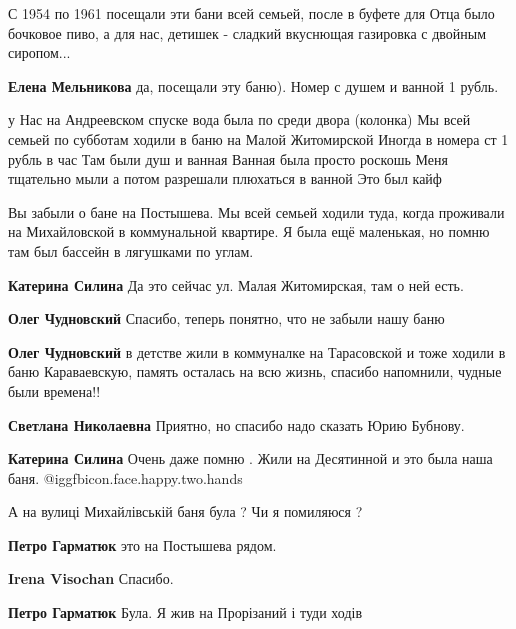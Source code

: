 \begin{itemize}
\begin{itemize}
С 1954 по 1961 посещали эти бани всей семьей, после в буфете для Отца было
бочковое пиво, а для нас, детишек - сладкий вкуснющая газировка с двойным
сиропом...


\textbf{Елена Мельникова} да, посещали эту баню). Номер с душем и ванной 1 рубль.
\end{itemize} %


у Нас на Андреевском спуске вода была по среди двора (колонка) Мы всей семьей
по субботам ходили в баню на Малой Житомирской Иногда в номера ст 1 рубль в час
Там были душ и ванная Ванная была просто роскошь Меня тщательно мыли а потом
разрешали плюхаться в ванной Это был кайф



Вы забыли о бане на Постышева. Мы всей семьей ходили туда, когда проживали на
Михайловской в коммунальной квартире. Я была ещё маленькая, но помню там был
бассейн в лягушками по углам.

\begin{itemize} %
\textbf{Катерина Силина} Да это сейчас ул. Малая Житомирская, там о ней есть.

\textbf{Олег Чудновский} Спасибо, теперь понятно, что не забыли нашу баню

\textbf{Олег Чудновский} в детстве жили в коммуналке на Тарасовской и тоже ходили в баню Караваевскую, память осталась на всю жизнь, спасибо напомнили, чудные были времена!!

\textbf{Светлана Николаевна} Приятно, но спасибо надо сказать Юрию Бубнову.

\textbf{Катерина Силина} Очень даже помню . Жили на Десятинной и это была наша баня. @igg{fbicon.face.happy.two.hands} 
\end{itemize} %

А на вулиці Михайлівській баня була ?
Чи я помиляюся ?

\begin{itemize} %
\textbf{Петро Гарматюк} это на Постышева рядом.

\textbf{Irena Visochan}
Спасибо.

\textbf{Петро Гарматюк} Була. Я жив на Прорізаний і туди ходів
\end{itemize} %


\end{itemize}
